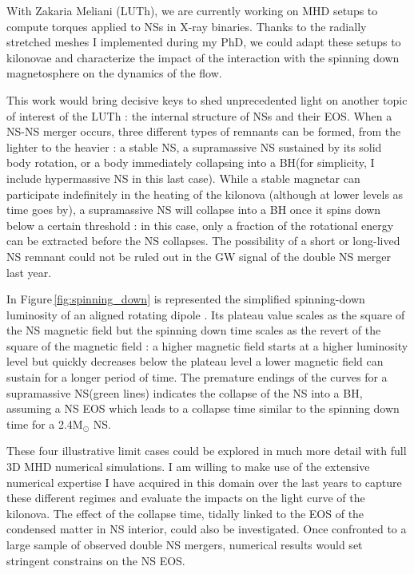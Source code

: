 \documentclass[12pt,onecolumn]{article}
\makeatletter
\newcommand{\gw}{GW\xspace}
\newcommand{\eos}{EOS\xspace}
\newcommand{\mhd}{MHD\xspace}
\newcommand*{\ns}{NS\@\xspace}
\newcommand*{\nss}{NSs\@\xspace}
\newcommand*{\bh}{BH\@\xspace}
\makeatother
\begin{document}
With Zakaria Meliani (LUTh), we are currently working on \mhd setups to compute torques applied to \nss in X-ray binaries. Thanks to the radially stretched meshes I implemented during my PhD, we could adapt these setups to kilonovae and characterize the impact of the interaction with the spinning down magnetosphere on the dynamics of the flow. 

This work would bring decisive keys to shed unprecedented light on another topic of interest of the LUTh : the internal structure of \nss and their \eos. When a \ns-\ns merger occurs, three different types of remnants can be formed, from the lighter to the heavier : a stable \ns, a supramassive \ns sustained by its solid body rotation, or a body immediately collapsing into a \bh (for simplicity, I include hypermassive \ns in this last case). While a stable magnetar can participate indefinitely in the heating of the kilonova (although at lower levels as time goes by), a supramassive \ns will collapse into a \bh once it spins down below a certain threshold : in this case, only a fraction of the rotational energy can be extracted before the \ns collapses. The possibility of a short or long-lived \ns remnant could not be ruled out in the \gw signal of the double \ns merger last year.

In Figure\,\ref{fig:spinning_down} is represented the simplified spinning-down luminosity of an aligned rotating dipole \citep{Spitkovsky2006,Philippov2014}. Its plateau value scales as the square of the \ns magnetic field but the spinning down time scales as the revert of the square of the magnetic field : a higher magnetic field starts at a higher luminosity level but quickly decreases below the plateau level a lower magnetic field can sustain for a longer period of time. The premature endings of the curves for a supramassive \ns (green lines) indicates the collapse of the \ns into a \bh, assuming a \ns \eos which leads to a collapse time similar to the spinning down time for a 2.4M$_{\odot}$ \ns \citep[based on][]{Metzger2015}.

These four illustrative limit cases could be explored in much more detail with full 3D \mhd numerical simulations. I am willing to make use of the extensive numerical expertise I have acquired in this domain over the last years to capture these different regimes and evaluate the impacts on the light curve of the kilonova. The effect of the collapse time, tidally linked to the \eos of the condensed matter in \ns interior, could also be investigated. Once confronted to a large sample of observed double \ns mergers, numerical results would set stringent constrains on the \ns \eos.
\end{document}
